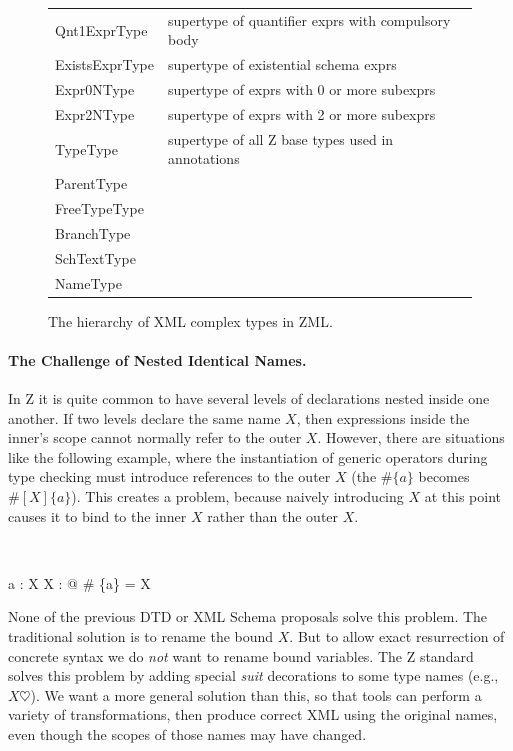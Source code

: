 \documentclass{llncs}  %
\begin{document}
\begin{figure}[htb]
\begin{scriptsize}
\begin{tabular}{ll}
\I\I\I\I  Qnt1ExprType    &supertype of quantifier exprs with compulsory body\\
\I\I\I\I\I  ExistsExprType &supertype of existential schema exprs\\
\I\I\I  Expr0NType        &supertype of exprs with 0 or more subexprs\\
\I\I\I\I  Expr2NType      &supertype of exprs with 2 or more subexprs\\
\I\I  TypeType            &supertype of all Z base types used in annotations\\
\I\I  ParentType          &\\
\I\I  FreeTypeType        &\\
\I\I  BranchType          &\\
\I\I  SchTextType         &\\
\I\I  NameType            &\\
\end{tabular}
\end{scriptsize}
\caption{The hierarchy of XML complex types in ZML.}
\label{fig:hier}
\end{figure}


\paragraph{The Challenge of Nested Identical Names.}

In Z it is quite common to have several levels of declarations nested 
inside one another.  If two levels declare the same name $X$, then
expressions inside the inner's scope cannot normally refer to the outer $X$.
However, there are situations like the following example, where the
instantiation of generic operators during type checking must
introduce references to the outer $X$ (the $\# \{a\}$ becomes
$\#[X]\{a\}$). This creates a problem, because naively introducing
$X$ at this point causes it to bind to the inner $X$ rather than 
the outer $X$. 
\begin{zed}
    [X] \\
\end{zed}
\begin{axdef}
    a : X
\where
    \exists X : \nat @ \# \{a\} = X
\end{axdef}


None of the previous DTD or XML Schema proposals solve this problem.  The
traditional solution is to rename the bound $X$.  But to allow exact
resurrection of concrete syntax we do \emph{not} want to rename bound
variables.  The Z standard solves this problem by adding special
\emph{suit} decorations to some type names (e.g., $X\heartsuit$).  We want a
more general solution than this, so that tools can perform a variety of
transformations, then produce correct XML using the original names, even
though the scopes of those names may have changed.
\end{document}
